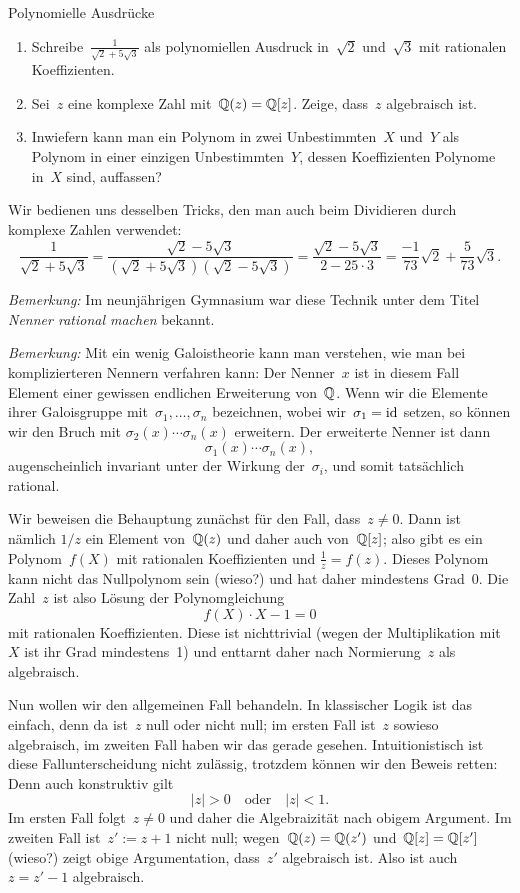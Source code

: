 \documentclass{algblatt}
\begin{document}
\begin{aufgabe}{Polynomielle Ausdrücke}
\begin{enumerate}
\item Schreibe~$\frac{1}{\sqrt{2} + 5\sqrt{3}}$ als polynomiellen Ausdruck
in~$\sqrt{2}$ und~$\sqrt{3}$ mit rationalen Koeffizienten.
\item Sei~$z$ eine komplexe Zahl mit~$\mathbb{Q}(z) = \mathbb{Q}[z]$. Zeige, dass~$z$
algebraisch ist.
\item Inwiefern kann man ein Polynom in zwei Unbestimmten~$X$ und~$Y$ als
Polynom in einer einzigen Unbestimmten~$Y$, dessen Koeffizienten
Polynome in~$X$ sind, auffassen?
\end{enumerate}
\begin{loesungE}
\item Wir bedienen uns desselben Tricks, den man auch beim Dividieren durch
komplexe Zahlen verwendet:
\[ \frac{1}{\sqrt{2} + 5\sqrt{3}} =
  \frac{\sqrt{2} - 5\sqrt{3}}{(\sqrt{2} + 5\sqrt{3}) (\sqrt{2} - 5\sqrt{3})} =
  \frac{\sqrt{2} - 5\sqrt{3}}{2 - 25 \cdot 3} =
  \frac{-1}{73} \sqrt{2} + \frac{5}{73} \sqrt{3}. \]

\emph{Bemerkung:} Im neunjährigen Gymnasium war diese Technik unter dem Titel
\emph{Nenner rational machen} bekannt.

\emph{Bemerkung:} Mit ein wenig Galoistheorie kann man verstehen, wie man
bei komplizierteren Nennern verfahren kann: Der Nenner~$x$ ist in diesem Fall
Element einer gewissen endlichen Erweiterung von~$\mathbb{Q}$. Wenn wir die Elemente
ihrer Galoisgruppe mit~$\sigma_1, \ldots, \sigma_n$ bezeichnen, wobei
wir~$\sigma_1 = \mathrm{id}$ setzen, so können wir den Bruch mit $\sigma_2(x) \cdots
\sigma_n(x)$ erweitern. Der erweiterte Nenner ist dann
\[ \sigma_1(x) \cdots \sigma_n(x), \]
augenscheinlich invariant unter der Wirkung der~$\sigma_i$, und somit
tatsächlich rational.

\item Wir beweisen die Behauptung zunächst für den Fall, dass~$z \neq 0$. Dann
ist nämlich $1/z$ ein Element von~$\mathbb{Q}(z)$ und daher auch von~$\mathbb{Q}[z]$; also
gibt es ein Polynom~$f(X)$ mit rationalen Koeffizienten und
$\frac{1}{z} = f(z)$. Dieses Polynom kann nicht das Nullpolynom sein (wieso?)
und hat daher mindestens Grad~0. Die Zahl~$z$ ist also Lösung der
Polynomgleichung
\[ f(X) \cdot X - 1 = 0 \]
mit rationalen Koeffizienten. Diese ist nichttrivial (wegen der Multiplikation
mit~$X$ ist ihr Grad mindestens~1) und enttarnt daher nach Normierung~$z$ als
algebraisch.

Nun wollen wir den allgemeinen Fall behandeln. In klassischer Logik ist das
einfach, denn da ist~$z$ null oder nicht null; im ersten Fall ist~$z$ sowieso
algebraisch, im zweiten Fall haben wir das gerade gesehen. Intuitionistisch ist
diese Fallunterscheidung nicht zulässig, trotzdem können wir den Beweis retten:
Denn auch konstruktiv gilt
\[ |z| > 0 \quad\text{oder}\quad |z| < 1. \]
Im ersten Fall folgt~$z \neq 0$ und daher die Algebraizität nach obigem
Argument. Im zweiten Fall ist~$z' := z + 1$ nicht null; wegen~$\mathbb{Q}(z) =
\mathbb{Q}(z')$ und~$\mathbb{Q}[z] = \mathbb{Q}[z']$ (wieso?) zeigt obige Argumentation, dass~$z'$
algebraisch ist. Also ist auch~$z = z' - 1$ algebraisch.


\end{loesungE}
\end{aufgabe}
\end{document}
